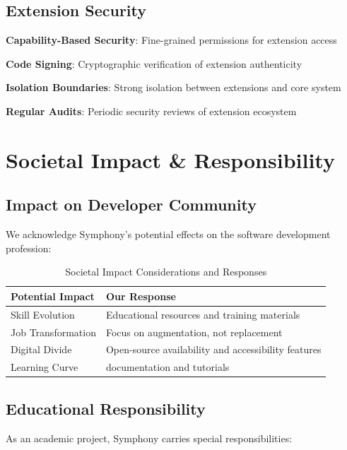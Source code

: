 \subsection*{Extension Security}
\begin{compactlist}
    \item \textbf{Capability-Based Security}: Fine-grained permissions for extension access
    \item \textbf{Code Signing}: Cryptographic verification of extension authenticity
    \item \textbf{Isolation Boundaries}: Strong isolation between extensions and core system
    \item \textbf{Regular Audits}: Periodic security reviews of extension ecosystem
\end{compactlist}

\section*{Societal Impact \& Responsibility}

\subsection*{Impact on Developer Community}
We acknowledge Symphony's potential effects on the software development profession:

\begin{table}[ht]
\centering
\begin{tabular}{@{}ll@{}}
\toprule
\textbf{Potential Impact} & \textbf{Our Response} \\
\midrule
Skill Evolution & Educational resources and training materials \\
Job Transformation & Focus on augmentation, not replacement \\
Digital Divide & Open-source availability and accessibility features \\
Learning Curve &  documentation and tutorials \\
\bottomrule
\end{tabular}
\caption{Societal Impact Considerations and Responses}
\end{table}

\subsection*{Educational Responsibility}
As an academic project, Symphony carries special responsibilities:

